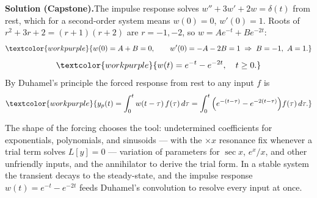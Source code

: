\medskip
\noindent\textbf{Solution (Capstone).}\quad The impulse response solves
$w'' + 3w' + 2w = \delta(t)$ from rest, which for a second-order system means
$w(0)=0$, $w'(0)=1$. Roots of $r^2+3r+2=(r+1)(r+2)$ are $r=-1,-2$, so
$w = A e^{-t} + B e^{-2t}$:
\[ \textcolor{workpurple}{w(0) = A + B = 0, \qquad w'(0) = -A - 2B = 1 \;\Rightarrow\; B = -1,\ A = 1.} \]
\[ \textcolor{workpurple}{w(t) = e^{-t} - e^{-2t}, \quad t \ge 0.} \]
By Duhamel's principle the forced response from rest to any input $f$ is
\[ \textcolor{workpurple}{y_p(t) = \int_0^t w(t-\tau)\,f(\tau)\,d\tau
   = \int_0^t \Big(e^{-(t-\tau)} - e^{-2(t-\tau)}\Big) f(\tau)\,d\tau.} \]

\vspace{0.8em}
\begin{conceptbox}
The shape of the forcing chooses the tool:
\textcolor{accentorange}{undetermined coefficients} for exponentials,
polynomials, and sinusoids --- with the \textcolor{accentorange}{$\times x$
resonance fix} whenever a trial term solves $L[y]=0$ ---
\textcolor{accentorange}{variation of parameters} for $\sec x$, $e^x/x$, and other
unfriendly inputs, and the \textcolor{accentorange}{annihilator} to derive the
trial form. In a stable system the \textcolor{accentorange}{transient} decays to
the \textcolor{accentorange}{steady-state}, and the
\textcolor{accentorange}{impulse response $w(t)=e^{-t}-e^{-2t}$} feeds
\textcolor{accentorange}{Duhamel's convolution} to resolve every input at once.
\end{conceptbox}


